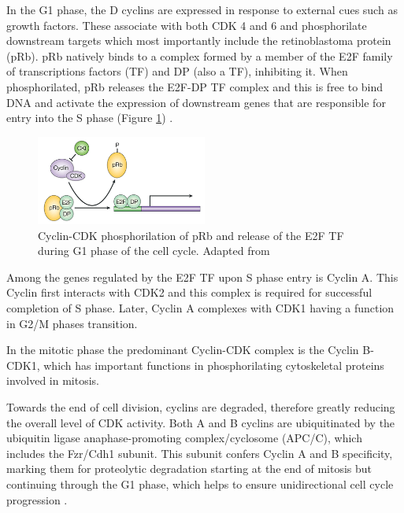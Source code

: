 \documentclass[11pt,twoside,a4paper]{report}
\begin{document}
				In the G1 phase, the D cyclins are expressed in response to external cues such as growth factors. These associate with both CDK 4 and 6 and phosphorilate downstream targets which most importantly include the retinoblastoma protein (pRb). pRb natively binds to a complex formed by a member of the E2F family of transcriptions factors (TF) and DP (also a TF), inhibiting it. When phosphorilated, pRb releases the E2F-DP TF complex and this is free to bind DNA and activate the expression of downstream genes that are responsible for entry into the S phase (Figure \ref{fig:pRb-E2F}) \cite{Trimarchi2002} \cite{Sclafani2007}.
				
				\begin{figure}[here]
					\centering
					\includegraphics[width=0.5\textwidth]{pngs/CDK-pRb-E2F-DP.png}
					\caption[Cyclin-CDK phosphorilation of pRb and release of the E2F TF during G1 phase of the cell cycle]
					{Cyclin-CDK phosphorilation of pRb and release of the E2F TF during G1 phase of the cell cycle. {\footnotesize Adapted from \cite{Frisch2002}}}
					\label{fig:pRb-E2F}
				\end{figure}
				
				Among the genes regulated by the E2F TF upon S phase entry is Cyclin A. This Cyclin first interacts with CDK2 and this complex is required for successful completion of S phase. Later, Cyclin A complexes with CDK1 having a function in G2/M phases transition.
				
				In the mitotic phase the predominant Cyclin-CDK complex is the Cyclin B-CDK1, which has important functions in phosphorilating cytoskeletal proteins involved in mitosis.
				
				Towards the end of cell division, cyclins are degraded, therefore greatly reducing the overall level of CDK activity. Both A and B cyclins are ubiquitinated by the ubiquitin ligase anaphase-promoting complex/cyclosome (APC/C), which includes the Fzr/Cdh1 subunit. This subunit confers Cyclin A and B specificity, marking them for proteolytic degradation starting at the end of mitosis but continuing through the G1 phase, which helps to ensure unidirectional cell cycle progression \cite{Sclafani2007}.	
				
\end{document}
